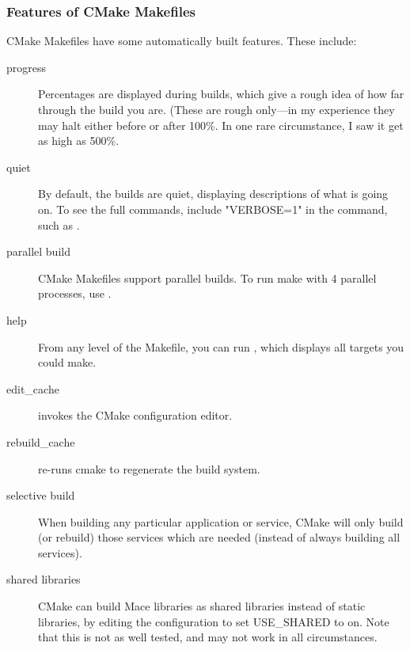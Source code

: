 \subsubsection{Features of CMake Makefiles}

CMake Makefiles have some automatically built features.  These include:
\begin{description}
\item [progress] Percentages are displayed during builds, which give a
rough idea of how far through the build you are.  (These are rough
only---in my experience they may halt either before or after 100\%.  In
one rare circumstance, I saw it get as high as 500\%.
\item [quiet] By default, the builds are quiet, displaying descriptions
of what is going on.  To see the full commands, include "VERBOSE=1" in
the command, such as .
\item [parallel build] CMake Makefiles support parallel builds.  To run
make with 4 parallel processes, use .  
\item [help] From any level of the Makefile, you can run , which displays all targets you could make.
\item [edit\_cache]  invokes the CMake configuration editor.
\item [rebuild\_cache]  re-runs cmake to
regenerate the build system.
\item [selective build] When building any particular application or
service, CMake will only build (or rebuild) those services which are
needed (instead of always building all services).
\item [shared libraries] CMake can build Mace libraries as shared
libraries instead of static libraries, by editing the configuration to
set USE\_SHARED to on.  Note that this is not as well tested, and may
not work in all circumstances.
\end{description}
